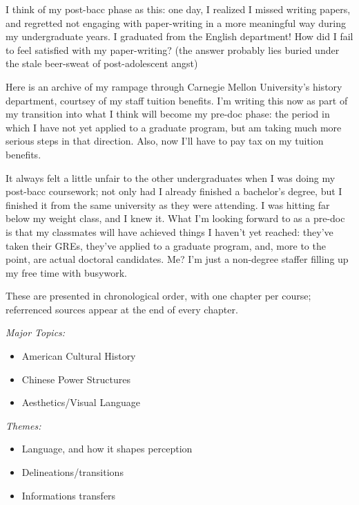 I think of my post-bacc phase as this: one day, I realized I missed writing
papers, and regretted not engaging with paper-writing in a more meaningful way
during my undergraduate years. I graduated from the English department! How did
I fail to feel satisfied with my paper-writing? (the answer probably lies buried
under the stale beer-sweat of post-adolescent angst)

Here is an archive of my rampage through Carnegie Mellon University's history
department, courtsey of my staff tuition benefits. I'm writing this now as part
of my transition into what I think will become my pre-doc phase: the period in
which I have not yet applied to a graduate program, but am taking much more
serious steps in that direction. Also, now I'll have to pay tax on my tuition
benefits.

It always felt a little unfair to the other undergraduates when I was doing my
post-bacc coursework; not only had I already finished a bachelor's degree, but I
finished it from the same university as they were attending. I was hitting far
below my weight class, and I knew it. What I'm looking forward to as a pre-doc
is that my classmates will have achieved things I haven't yet reached: they've
taken their GREs, they've applied to a graduate program, and, more to the point,
are actual doctoral candidates. Me? I'm just a non-degree staffer filling up my
free time with busywork.

These are presented in chronological order, with one chapter per course;
referrenced sources appear at the end of every chapter.

\textit{Major Topics:}
    \begin{itemize}
    \item American Cultural History
    \item Chinese Power Structures
    \item Aesthetics/Visual Language
    \end{itemize}

\textit{Themes:}
    \begin{itemize}
    \item Language, and how it shapes perception
    \item Delineations/transitions
    \item Informations transfers
    \end{itemize}
